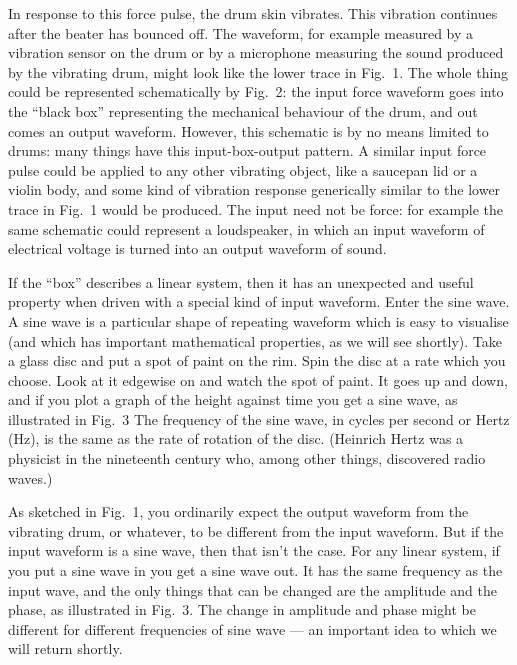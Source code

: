   In response to this force pulse, the drum skin vibrates. This vibration 
  continues after the beater has bounced off. The waveform, for example 
  measured by a vibration sensor on the drum or by a microphone measuring the 
  sound produced by the vibrating drum, might look like the lower trace in 
  Fig.\ 1. The whole thing could be represented schematically by Fig.\ 2: the 
  input force waveform goes into the ``black box'' representing the mechanical 
  behaviour of the drum, and out comes an output waveform. However, this 
  schematic is by no means limited to drums: many things have this 
  input-box-output pattern. A similar input force pulse could be applied to any 
  other vibrating object, like a saucepan lid or a violin body, and some kind 
  of vibration response generically similar to the lower trace in Fig.\ 1 would 
  be produced. The input need not be force: for example the same schematic 
  could represent a loudspeaker, in which an input waveform of electrical 
  voltage is turned into an output waveform of sound. 

  If the ``box'' describes a linear system, then it has an unexpected and 
  useful property when driven with a special kind of input waveform. Enter the 
  sine wave. A sine wave is a particular shape of repeating waveform which is 
  easy to visualise (and which has important mathematical properties, as we 
  will see shortly). Take a glass disc and put a spot of paint on the rim. Spin 
  the disc at a rate which you choose. Look at it edgewise on and watch the 
  spot of paint. It goes up and down, and if you plot a graph of the height 
  against time you get a sine wave, as illustrated in Fig.\ 3 The frequency of 
  the sine wave, in cycles per second or Hertz (Hz), is the same as the rate of 
  rotation of the disc. (Heinrich Hertz was a physicist in the nineteenth 
  century who, among other things, discovered radio waves.) 

  As sketched in Fig.\ 1, you ordinarily expect the output waveform from the 
  vibrating drum, or whatever, to be different from the input waveform. But if 
  the input waveform is a sine wave, then that isn't the case. For any linear 
  system, if you put a sine wave in you get a sine wave out. It has the same 
  frequency as the input wave, and the only things that can be changed are the 
  amplitude and the phase, as illustrated in Fig.\ 3. The change in amplitude 
  and phase might be different for different frequencies of sine wave --- an 
  important idea to which we will return shortly. 

